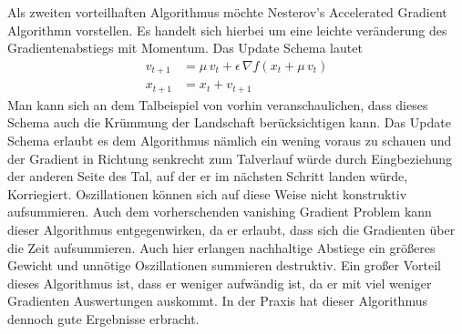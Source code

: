 \documentclass[12pt]{article}
\begin{document}
Als zweiten vorteilhaften Algorithmus möchte Nesterov's Accelerated Gradient Algorithmn vorstellen. Es handelt sich hierbei um eine leichte veränderung des Gradientenabstiegs mit Momentum. Das Update Schema lautet
\begin{align*}
    v_{t+1}&=\mu\,v_t+\epsilon\,\nabla{f}(x_t+\mu\,v_t)\\
    x_{t+1}&=x_t+v_{t+1}
\end{align*}
Man kann sich an dem Talbeispiel von vorhin veranschaulichen, dass dieses Schema auch die Krümmung der Landschaft berücksichtigen kann. Das Update Schema erlaubt es dem Algorithmus nämlich ein wening voraus zu schauen und der Gradient in Richtung senkrecht zum Talverlauf würde durch Eingbeziehung der anderen Seite des Tal, auf der er im nächsten Schritt landen würde, Korriegiert. Oszillationen können sich auf diese Weise nicht konstruktiv aufsummieren. Auch dem vorherschenden vanishing Gradient Problem kann dieser Algorithmus entgegenwirken, da er erlaubt, dass sich die Gradienten über die Zeit aufsummieren. Auch hier erlangen nachhaltige Abstiege ein größeres Gewicht und unnötige Oszillationen summieren destruktiv. Ein großer Vorteil dieses Algorithmus ist, dass er weniger aufwändig ist, da er mit viel weniger Gradienten Auswertungen auskommt. In der Praxis hat dieser Algorithmus dennoch gute Ergebnisse erbracht.
\end{document}
